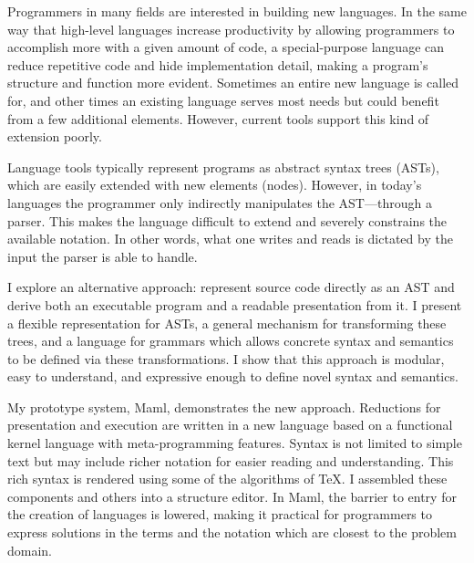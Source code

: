 Programmers in many fields are interested in building new languages. In the same way that high-level languages increase productivity by allowing programmers to accomplish more with a given amount of code, a special-purpose language can reduce repetitive code and hide implementation detail, making a program's structure and function more evident. Sometimes an entire new language is called for, and other times an existing language serves most needs but could benefit from a few additional elements. However, current tools support this kind of extension poorly.

Language tools typically represent programs as abstract syntax trees (ASTs), which are easily extended with new elements (nodes). However, in today's languages the programmer only indirectly manipulates the AST---through a parser. This makes the language difficult to extend and severely constrains the available notation. In other words, what one writes and reads is dictated by the input the parser is able to handle.

I explore an alternative approach: represent source code directly as an AST and derive both an executable program and a readable presentation from it. I present a flexible representation for ASTs, a general mechanism for transforming these trees, and a language for grammars which allows concrete syntax and semantics to be defined via these transformations. I show that this approach is modular, easy to understand, and expressive enough to define novel syntax and semantics.

My prototype system, Maml, demonstrates the new approach. Reductions for presentation and execution are written in a new language based on a functional kernel language with meta-programming features. Syntax is not limited to simple text but may include richer notation for easier reading and understanding. This rich syntax is rendered using some of the algorithms of \TeX. I assembled these components and others into a structure editor. In Maml, the barrier to entry for the creation of languages is lowered, making it practical for programmers to express solutions in the terms and the notation which are closest to the problem domain.